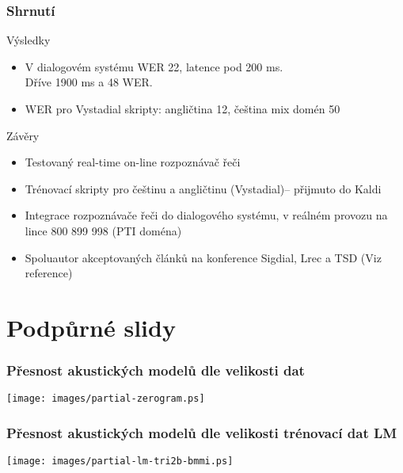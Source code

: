 \begin{frame}\frametitle{Shrnutí} 
    \begin{exampleblock}{Výsledky}
    \begin{itemize}
        \item V dialogovém systému WER 22, latence pod 200 ms. \\ {\scriptsize Dříve 1900 ms a 48 WER}. 
        \item WER pro Vystadial skripty: angličtina 12, čeština mix domén 50
    \end{itemize}
    \end{exampleblock}
    \begin{block}{Závěry}
    \begin{itemize}
        \item Testovaný real-time on-line rozpoznávač řeči
        \item Trénovací skripty pro češtinu a angličtinu {\scriptsize (Vystadial)}-- přijmuto do Kaldi
        \item Integrace rozpoznávače řeči do dialogového systému, v reálném provozu na lince 800 899 998 (PTI doména)
        \item Spoluautor akceptovaných článků na konference Sigdial, Lrec a TSD (Viz reference) 
    \end{itemize}
    \end{block}
\end{frame}


\section{Podpůrné slidy} %

\begin{frame}\frametitle{Přesnost akustických modelů dle velikosti dat} 
    \begin{center}
        \texttt{[image: images/partial-zerogram.ps]}
    \end{center}
\end{frame}

\begin{frame}\frametitle{Přesnost akustických modelů dle velikosti trénovací dat LM} 
    \begin{center}
        \texttt{[image: images/partial-lm-tri2b-bmmi.ps]}
    \end{center}
\end{frame}


